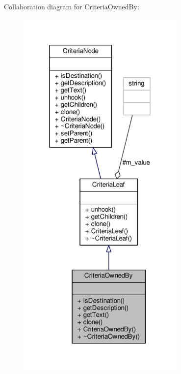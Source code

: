 Collaboration diagram for Criteria\+Owned\+By\+:
\nopagebreak
\begin{figure}[H]
\begin{center}
\leavevmode
\includegraphics[width=235pt]{d9/d4b/classCriteriaOwnedBy__coll__graph}
\end{center}
\end{figure}
